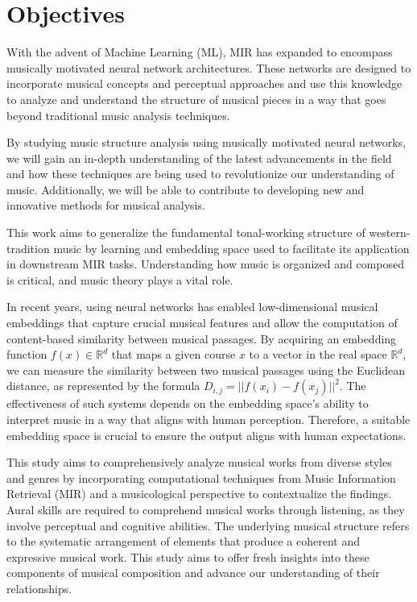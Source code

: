 \section{Objectives}

With the advent of Machine Learning (ML), MIR has expanded to encompass musically motivated neural network architectures. These networks are designed to incorporate musical concepts and perceptual approaches and use this knowledge to analyze and understand the structure of musical pieces in a way that goes beyond traditional music analysis techniques.


By studying music structure analysis using musically motivated neural networks, we will gain an in-depth understanding of the latest advancements in the field and how these techniques are being used to revolutionize our understanding of music. Additionally, we will be able to contribute to developing new and innovative methods for musical analysis.

This work aims to generalize the fundamental tonal-working structure of western-tradition music by learning and embedding space used to facilitate its application in downstream MIR tasks. Understanding how music is organized and composed is critical, and music theory plays a vital role.

In recent years, using neural networks has enabled low-dimensional musical embeddings that capture crucial musical features and allow the computation of content-based similarity between musical passages. By acquiring an embedding function $f(x) \in \mathbb{R}^d$ that maps a given course $x$ to a vector in the real space $\mathbb{R}^d$, we can measure the similarity between two musical passages using the Euclidean distance, as represented by the formula $D_{i,j} = ||f(x_i) - f(x_j)||^2$. The effectiveness of such systems depends on the embedding space's ability to interpret music in a way that aligns with human perception. Therefore, a suitable embedding space is crucial to ensure the output aligns with human expectations.

This study aims to comprehensively analyze musical works from diverse styles and genres by incorporating computational techniques from Music Information Retrieval (MIR) and a musicological perspective to contextualize the findings. Aural skills are required to comprehend musical works through listening, as they involve perceptual and cognitive abilities. The underlying musical structure refers to the systematic arrangement of elements that produce a coherent and expressive musical work. This study aims to offer fresh insights into these components of musical composition and advance our understanding of their relationships.

